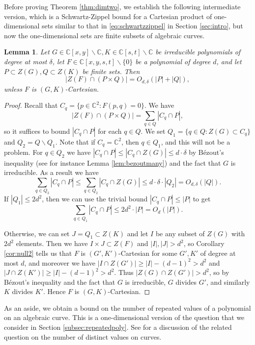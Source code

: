 \documentclass{daj}
\newtheorem{lemma}[theorem]{Lemma}
\theoremstyle{definition}
\newcommand{\C}{\mathbb C}
\begin{document}
Before proving Theorem \ref{thm:dimtwo}, we establish the following intermediate version, which is a Schwartz-Zippel bound for a Cartesian product of one-dimensional sets similar to that in \eqref{eq:schwartzzippel} in Section \ref{sec:intro}, but now the one-dimensional sets are finite subsets of algebraic curves.

\begin{lemma}
\label{lem:curvecurve}
Let $G\in \C[x,y]\backslash\C, K\in \C[s,t]\backslash\C$ be irreducible polynomials of degree at most $\delta$, 
let $F\in \C[x,y,s,t]\backslash \{0\}$ be a polynomial of degree $d$, 
and let $P\subset Z(G),Q\subset Z(K)$ be finite sets.
Then
\[|Z(F)\cap (P\times Q)| = O_{d,\delta}(|P|+|Q|),\]
unless $F$ is $(G,K)$-Cartesian.
\end{lemma}
\begin{proof}
Recall that $C_q=\{p\in \C^2:F(p,q)=0\}$.
We have
\[|Z(F)\cap (P\times Q)| = \sum_{q \in Q} |C_q\cap P|,\]
so it suffices to bound $|C_q \cap P|$ for each $q\in Q$. 
We set $Q_1 = \{q\in Q: Z(G)\subset C_q\}$ and $Q_2 = Q\backslash Q_1$.
Note that if $C_q = \C^2$, then $q\in Q_1$, and this will not be a problem.
For $q \in Q_2$ we have $|C_q\cap P|\leq |C_q \cap Z(G)|\leq d\cdot \delta$ by B\'{e}zout's inequality (see for instance Lemma \ref{lem:bezoutmany}) and the fact that $G$ is irreducible.
As a result we have 
\[\sum_{q \in Q_2} |C_q \cap P|\le \sum_{q \in Q_2} |C_q\cap Z(G)| \le d\cdot \delta\cdot |Q_2|  = O_{d,\delta}(|Q|).\]
If $|Q_1|\leq 2d^2$, then we can use the trivial bound $|C_q\cap P|\leq |P|$ to get 
\[\sum_{q \in Q_1} |C_q\cap  P| \le 2d^2\cdot |P| = O_d(|P|).\]

Otherwise, we can set $J=Q_1\subset Z(K)$ and let $I$ be any subset of $Z(G)$ with $2d^2$ elements.
Then we have $I\times J\subset Z(F)$ and $|I|,|J|>d^2$, so Corollary \ref{cor:null2} tells us that $F$ is $(G',K')$-Cartesian for some $G',K'$ of degree at most $d$, 
and moreover we have $|I\cap Z(G')|\ge |I|-(d-1)^2 > d^2$ and 
$|J\cap Z(K')|\ge|I|-(d-1)^2 > d^2$.
Thus $|Z(G)\cap Z(G')|>d^2$, 
so by B\'ezout's inequality and the fact that $G$ is irreducible, $G$ divides $G'$, and similarly $K$ divides $K'$.
Hence $F$ is $(G,K)$-Cartesian.
\end{proof}

As an aside, we obtain a bound on the number of repeated values of a polynomial on an algebraic curve.
This is a one-dimensional version of the question that we consider in Section \ref{subsec:repeatedpoly}.
See \cite{VZ} for a discussion of the related question on the number of distinct values on curves.
\end{document}

